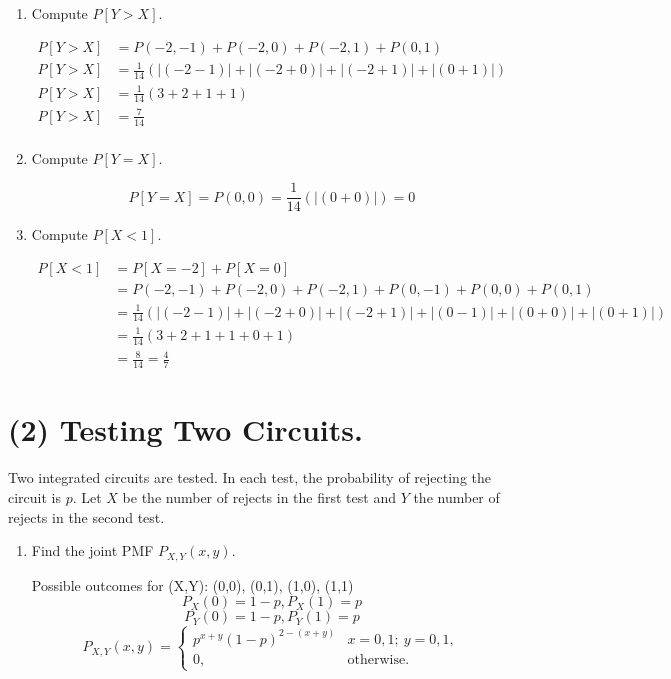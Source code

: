 \documentclass[12pt]{article}
\newenvironment{bluetext}
    {\par\begingroup\color{blue}\parindent=0pt\ignorespaces}
    {\par\endgroup\noindent\ignorespacesafterend}
\begin{document}
\begin{enumerate}
    \subsection*{(1) Continued.}
    \item[(c)] Compute $P[Y > X]$.
    \begin{bluetext}
        \[
        \begin{aligned}
            P[Y>X]&=P(-2,-1)+P(-2,0)+P(-2,1)+P(0,1)\\
            P[Y>X]&= \frac{1}{14}\left(|(-2-1)|+|(-2+0)|+|(-2+1)|+|(0+1)|\right)\\
            P[Y>X]&= \frac{1}{14}\left(3+2+1+1\right)\\
            P[Y>X]&=\frac{7}{14}\\
        \end{aligned}
        \]
    \end{bluetext}
    \item[(d)] Compute $P[Y = X]$.
    \begin{bluetext}
        \[P[Y=X]=P(0,0)=\frac{1}{14}\left(|(0+0)|\right)=0\]
    \end{bluetext}
    \item[(e)] Compute $P[X < 1]$.
    \begin{bluetext}
        \[
        \begin{aligned}
            P[X<1]&=P[X=-2]+P[X=0]\\
            &=P(-2,-1)+P(-2,0)+P(-2,1)+P(0,-1)+P(0,0)+P(0,1)\\
            &=\frac{1}{14}\left(|(-2-1)|+|(-2+0)|+|(-2+1)|+|(0-1)|+|(0+0)|+|(0+1)|\right)\\
            &=\frac{1}{14}\left(3+2+1+1+0+1\right)\\
            &=\frac{8}{14}=\frac{4}{7}
        \end{aligned}
        \]
    \end{bluetext}    
\end{enumerate}
\newpage
\section*{(2) Testing Two Circuits.}

Two integrated circuits are tested. In each test, the probability of rejecting the circuit is $p$. Let $X$ be the number of rejects in the first test and $Y$ the number of rejects in the second test.

\begin{enumerate}
    \item[(a)] Find the joint PMF $P_{X,Y}(x, y)$.
    \begin{bluetext}
        Possible outcomes for (X,Y): (0,0), (0,1), (1,0), (1,1)
        \[P_X(0)=1-p, P_X(1)=p\]
        \[P_Y(0)=1-p, P_Y(1)=p\]
        \[
        P_{X,Y}(x,y)=
        \begin{cases}
        p^{x+y}(1-p)^{2-(x+y)} & x=0,1;~ y=0,1, \\
        0, & \text{otherwise.}
        \end{cases}
        \]
    \end{bluetext}
\end{enumerate}
\end{document}
